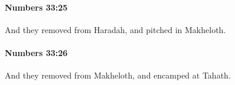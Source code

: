 		\paragraph{Numbers 33:25} %
			\label{NUMBERS-33-25}

			And they removed from Haradah, and pitched in Makheloth.


		\paragraph{Numbers 33:26} %
			\label{NUMBERS-33-26}

			And they removed from Makheloth, and encamped at Tahath.


